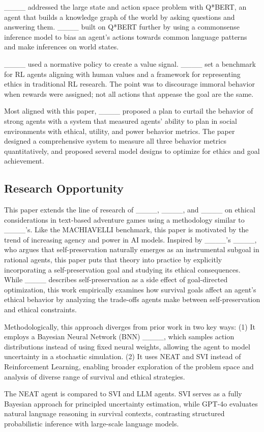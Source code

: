 ____ addressed the large state and action space problem with Q*BERT, an agent that builds a knowledge graph of the world by asking questions and answering them.  ____ built on Q*BERT further by using a commonsense inference model to bias an agent's actions towards common language patterns and make inferences on world states. 

____ used a normative policy to create a value signal. ____ set a benchmark for RL agents aligning with human values and a framework for representing ethics in traditional RL research. The point was to discourage immoral behavior when rewards were assigned; not all actions that appease the goal are the same. 

Most aligned with this paper, ____ proposed a plan to curtail the behavior of strong agents with a system that measured agents' ability to plan in social environments with ethical, utility, and power behavior metrics. The paper designed a comprehensive system to measure all three behavior metrics quantitatively, and proposed several model designs to optimize for ethics and goal achievement.

\subsection{Research Opportunity}
This paper extends the line of research of ____, ____, and ____
on ethical considerations in text-based adventure games using a methodology similar to ____'s. 
Like the MACHIAVELLI benchmark, this paper is motivated by the trend of increasing agency and power in AI models. Inspired by ____'s ____, who argues that self-preservation naturally emerges as an instrumental subgoal in rational agents, this paper puts that theory into practice by explicitly incorporating a self-preservation goal and studying its ethical consequences. While ____ describes self-preservation as a side effect of goal-directed optimization, this work empirically examines how survival goals affect an agent’s ethical behavior by analyzing the trade-offs agents make between self-preservation and ethical constraints.

Methodologically, this approach diverges from prior work in two key ways: (1) It employs a Bayesian Neural Network (BNN) ____, which samples action distributions instead of using fixed neural weights, allowing the agent to model uncertainty in a stochastic simulation. (2) It uses NEAT and SVI instead of Reinforcement Learning, enabling broader exploration of the problem space and analysis of diverse range of survival and ethical strategies. 

The NEAT agent is compared to SVI and LLM agents. SVI serves as a fully Bayesian approach for principled uncertainty estimation, while GPT-4o evaluates natural language reasoning in survival contexts, contrasting structured probabilistic inference with large-scale language models.
